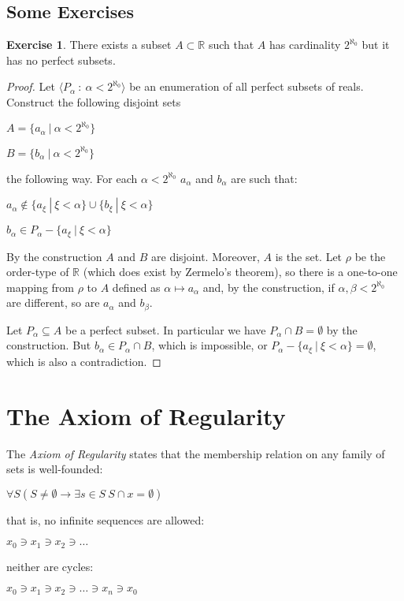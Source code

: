 \documentclass[8pt]{article}
\theoremstyle{definition}
\theoremstyle{definition}
\theoremstyle{definition}
\theoremstyle{definition}
\theoremstyle{definition}
\theoremstyle{definition}
\theoremstyle{definition}
\theoremstyle{definition}
\theoremstyle{definition}
\theoremstyle{definition}
\theoremstyle{definition}
\theoremstyle{definition}
\theoremstyle{definition}
\newtheorem{exercise}{Exercise}[section]
\theoremstyle{definition}
\theoremstyle{question}
\begin{document}
\subsection{Some Exercises}

\begin{exercise}
  There exists a subset $A \subset \mathbb{R}$ such that $A$ has cardinality $2^{\aleph_0}$ but it has no
  perfect subsets. 
\end{exercise}

\begin{proof}
  Let $\langle P_{\alpha} \: : \: \alpha < 2^{\aleph_0} \rangle$ be an enumeration of all perfect
  subsets of reals. Construct the following disjoint sets

  \begin{center}
    $A = \{ a_{\alpha} \: | \: \alpha < 2^{\aleph_0} \}$

    $B = \{ b_{\alpha} \: | \: \alpha < 2^{\aleph_0} \}$
  \end{center}
  the following way. For each $\alpha < 2^{\aleph_0}$ $a_{\alpha}$ and $b_{\alpha}$ are such that:
  \begin{center}
    $a_{\alpha} \notin \{ a_{\xi} \: | \: \xi < \alpha \} \cup \{ b_{\xi} \: | \: \xi < \alpha \}$

    $b_{\alpha} \in P_{\alpha} - \{ a_{\xi} \: | \: \xi < \alpha \}$
  \end{center}

  By the construction $A$ and $B$ are disjoint. Moreover, $A$ is the set. 
  Let $\rho$ be the order-type of $\mathbb{R}$ (which does exist by Zermelo's theorem), so there is a one-to-one
  mapping from $\rho$ to $A$ defined as $\alpha \mapsto a_{\alpha}$ and, by the construction, if 
  $\alpha, \beta < 2^{\aleph_0}$ are different, so are $a_{\alpha}$ and $b_{\beta}$.

  Let $P_{\alpha} \subseteq A$ be a perfect subset. In particular we have $P_{\alpha} \cap B= \emptyset$ by the construction.
  But $b_{\alpha} \in P_{\alpha} \cap B$, which is impossible, or $P_{\alpha} - \{ a_{\xi} \: | \: \xi < \alpha \} = \emptyset$, 
  which is also a contradiction.
\end{proof}

\section{The Axiom of Regularity}

The \emph{Axiom of Regularity} states that the membership relation on any family of sets is well-founded:
\begin{center}
  $\forall S (S \neq \emptyset \to \exists s \in S \: S \cap x = \emptyset)$
\end{center}
that is, no infinite sequences are allowed:
\begin{center}
  $x_0 \ni x_1 \ni x_2 \ni \dots$
\end{center}
neither are cycles:
\begin{center}
  $x_0 \ni x_1 \ni x_2 \ni \dots \ni x_n \ni x_0$
\end{center}
\end{document}
